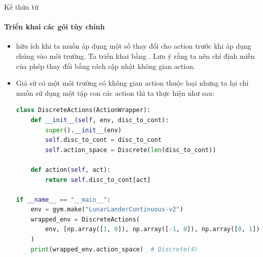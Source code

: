 \documentclass[10pt,aspectratio=169]{beamer}
\begin{document}
\begin{frame}[fragile]{Kế thừa từ }
\framesubtitle{Triển khai các gói tùy chỉnh}
\begin{itemize}
\setlength\itemsep{4pt}
\footnotesize
\item {} hữu ích khi ta muốn áp dụng một số thay đổi cho action trước khi áp dụng chúng vào môi trường. Ta triển khai  bằng . Lưu ý rằng ta nên chỉ định miền của phép thay đổi bằng cách cập nhật không gian action.
\item Giả sử có một môi trường có không gian action thuộc loại  nhưng ta lại chỉ muốn sử dụng một tập con các action thì ta thực hiện như sau:
\tiny
\begin{lstlisting}[language=Python]
class DiscreteActions(ActionWrapper):
    def __init__(self, env, disc_to_cont):
        super().__init__(env)
        self.disc_to_cont = disc_to_cont
        self.action_space = Discrete(len(disc_to_cont))

    def action(self, act):
        return self.disc_to_cont[act]

if __name__ == "__main__":
    env = gym.make("LunarLanderContinuous-v2")
    wrapped_env = DiscreteActions(
        env, [np.array([1, 0]), np.array([-1, 0]), np.array([0, 1]), np.array([0, -1])]
    )
    print(wrapped_env.action_space)  # Discrete(4)
\end{lstlisting}
\end{itemize}
\end{frame}
\end{document}
